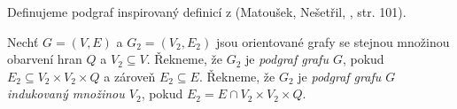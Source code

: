 Definujeme podgraf inspirovaný definicí z (Matoušek, Nešetřil, \cite{matouvsek2009kapitoly}, str. 101).
\begin{definice}[Podgraf]
    Nechť $G = (V,E)$ a $G_2 = (V_2, E_2)$ jsou orientované grafy se stejnou množinou obarvení hran $Q$ a $V_2 \subseteq V$. Řekneme, že $G_2$ je \emph{podgraf grafu $G$}, pokud $E_2 \subseteq V_2 \times V_2 \times Q$ a zároveň $E_2 \subseteq E$.
    Řekneme, že $G_2$ je \emph{podgraf grafu $G$ indukovaný množinou $V_2$}, pokud $E_2 =  E \cap V_2\times V_2 \times Q$.
\end{definice}


